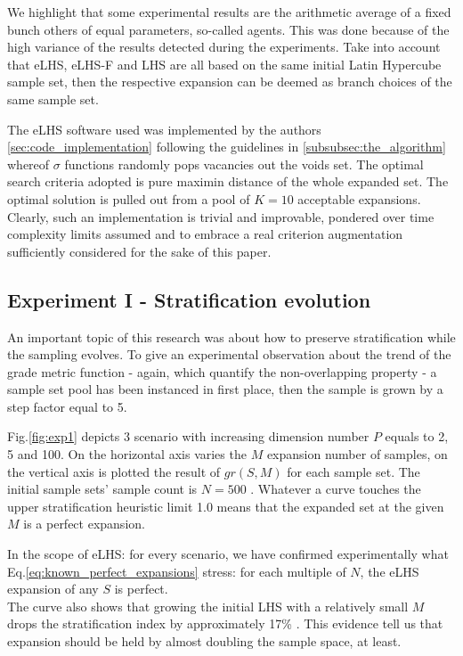 \documentclass[12pt]{extarticle}
\newcommand{\meqref}[1]{Eq.\ref{#1}}
\newcommand{\mfigref}[1]{Fig.\ref{#1}}
\begin{document}
We highlight that some experimental results are the arithmetic average of a fixed bunch others of equal parameters, so-called agents. This was done because of the high variance of the results detected during the experiments. Take into account that eLHS, eLHS-F and LHS are all based on the same initial Latin Hypercube sample set, then the respective expansion can be deemed as branch choices of the same sample set.

The eLHS software used was implemented by the authors \cref{sec:code_implementation} following the guidelines in \cref{subsubsec:the_algorithm} whereof $\sigma$ functions randomly pops vacancies out the voids set. The optimal search criteria adopted is pure maximin distance of the whole expanded set. The optimal solution is pulled out from a pool of $K = 10$ acceptable expansions. Clearly, such an implementation is trivial and improvable, pondered over time complexity limits assumed and to embrace a real criterion augmentation sufficiently considered for the sake of this paper.

\pagebreak
\subsection{Experiment I - Stratification evolution}
\label{subsec:exp1}
An important topic of this research was about how to preserve stratification while the sampling evolves. To give an experimental observation about the trend of the grade metric function - again, which quantify the non-overlapping property - a sample set pool has been instanced in first place, then the sample is grown by a step factor equal to 5. 

\mfigref{fig:exp1} depicts 3 scenario with increasing dimension number $P$ equals to 2, 5 and 100. On the horizontal axis varies the $M$ expansion number of samples, on the vertical axis is plotted the result of $gr(S, M)$ for each sample set. The initial sample sets' sample count is $N = 500$ . Whatever a curve touches the upper stratification heuristic limit 1.0 means that the expanded set at the given $M$ is a perfect expansion.

In the scope of eLHS: for every scenario, we have confirmed experimentally what \meqref{eq:known_perfect_expansions} stress: for each multiple of $N$, the eLHS expansion of any $S$ is perfect. \\
The curve also shows that growing the initial LHS with a relatively small $M$ drops the stratification index by approximately 17\% . This evidence tell us that expansion should be held by almost doubling the sample space, at least.
\end{document}
